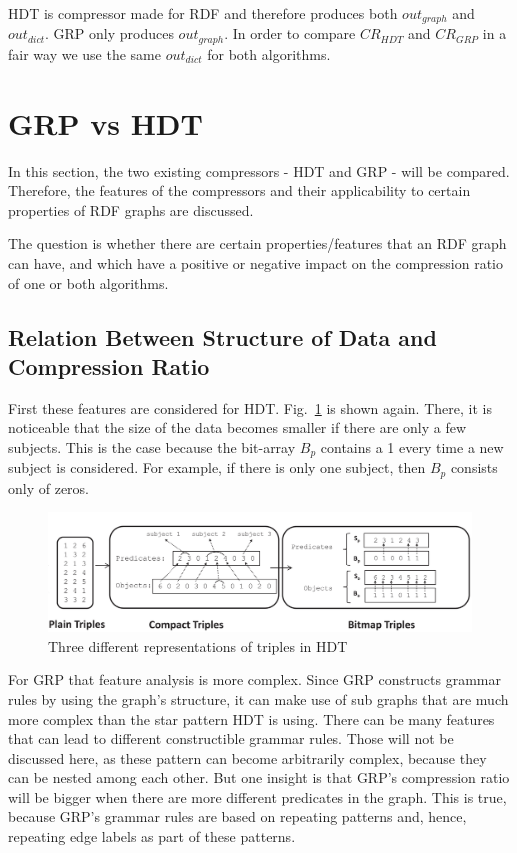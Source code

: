 HDT is compressor made for RDF and therefore produces both  $out_{graph}$ and $out_{dict}$. GRP only produces  $out_{graph}$. In order to compare $CR_{HDT}$ and $CR_{GRP}$ in a fair way we use the same $out_{dict}$ for both algorithms.

\section{GRP vs HDT}\label{sec:approachGRPvsHDT}

In this section, the two existing compressors - HDT and GRP - will be compared. Therefore, the features of the compressors and their applicability to certain properties of RDF graphs are discussed.

The question is whether there are certain properties/features that an RDF graph can have, and which have a positive or negative impact on the compression ratio of one or both algorithms. 

\subsection{Relation Between Structure of Data and Compression Ratio}\label{sec:relationDataStructureComprRatio}

First these features are considered for HDT. Fig.~\ref{fig:hdt_overview_1} is shown again. There, it is noticeable that the size of the data becomes smaller if there are only a few subjects. This is the case because the bit-array $B_p$ contains a 1 every time a new subject is considered. For example, if there is only one subject, then $B_p$ consists only of zeros.

\begin{figure}[h]
	\centering
	\includegraphics[width=1\textwidth]{figures/relatedwork/hdt1}
	\caption{Three different representations of triples in HDT}
	\label{fig:hdt_overview_1}
\end{figure}

For GRP that feature analysis is more complex. Since GRP constructs grammar rules by using the graph's structure, it can make use of sub graphs that are much more complex than the star pattern HDT is using. There can be many features that can lead to different constructible grammar rules. Those will not be discussed here, as these pattern can become arbitrarily complex, because they can be nested among each other. But one insight is that GRP's compression ratio will be bigger when there are more different predicates in the graph. This is true, because GRP's grammar rules are based on repeating patterns and, hence, repeating edge labels as part of these patterns.

